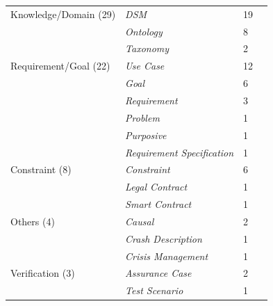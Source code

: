 \begin{tabular} {p{}  p{} p{} p{}}
Knowledge/Domain (29) & \emph{DSM} & 19 & \cite{ \papereleventh,\paperfortyfifth,\paperfiftyfirst,\paperfiftyfifth,\paperfiftyseventh,\paperfiftyeighth,\papersixtysixth,\papersixtyseventh,\papersixtyeighth,\papereightyfourth,\paperonehundredsecond,\paperonehundrednineteenth,\paperonehundredtwentythird,\paperonehundredtwentyseventh,\paperonehundredthirtythird,\paperonehundredfortysixth,\paperonehundredfortyninth,\paperonehundredninetyfirst,\papertwohundredseventh }\\ 
 & \emph{Ontology} & 8 & \cite{ \paperfortyseventh,\paperonehundredthirtysecond,\paperonehundredsixtythird,\paperonehundredseventieth,\paperonehundredeightyfourth,\papertwohundredfortyseventh,\papertwohundredfiftysecond,\papertwohundredfiftyfourth }\\ 
 & \emph{Taxonomy} & 2 & \cite{ \paperonehundredfifteenth,\papertwohundredfifteenth }\\ 
\midrule  
Requirement/Goal (22) & \emph{Use Case} & 12 & \cite{ \paperfourteenth,\paperseventeenth,\paperfortythird,\paperfortyninth,\paperseventieth,\papereightieth,\papereightyfifth,\paperonehundredthirteenth,\paperonehundredtwentyfifth,\papertwohundredfourth,\papertwohundredtwelfth,\papertwohundredfortieth }\\ 
 & \emph{Goal} & 6 & \cite{ \paperthirtyfifth,\paperthirtysixth,\paperonehundredsixtysixth,\paperonehundredseventyfirst,\paperonehundredseventysixth,\papertwohundredtwentyseventh }\\ 
 & \emph{Requirement} & 3 & \cite{ \paperfourteenth,\paperseventeenth,\paperfortyeighth }\\ 
 & \emph{Problem} & 1 & \cite{ \paperonehundredfiftythird }\\ 
 & \emph{Purposive} & 1 & \cite{ \paperonehundredtwentieth }\\ 
 & \emph{Requirement Specification} & 1 & \cite{ \paperonehundredtwentysecond }\\ 
\midrule  
Constraint (8) & \emph{Constraint} & 6 & \cite{ \paperfourth,\paperfortyseventh,\paperseventyeighth,\papereightyfourth,\paperonehundredsixth,\paperonehundredeightyeighth }\\ 
 & \emph{Legal Contract} & 1 & \cite{ \papertwohundredseventeenth }\\ 
 & \emph{Smart Contract} & 1 & \cite{ \paperonehundredeighteenth }\\ 
\midrule  
Others (4) & \emph{Causal} & 2 & \cite{ \paperthirtyseventh,\papertwohundredthirtysecond }\\ 
 & \emph{Crash Description} & 1 & \cite{ \papersixtyfifth }\\ 
 & \emph{Crisis Management} & 1 & \cite{ \papereightyeighth }\\ 
\midrule  
Verification (3) & \emph{Assurance Case} & 2 & \cite{ \paperonehundredseventyeighth,\paperonehundredeightieth }\\ 
 & \emph{Test Scenario} & 1 & \cite{ \paperthird }\\ 
\bottomrule 
\end{tabular} 
